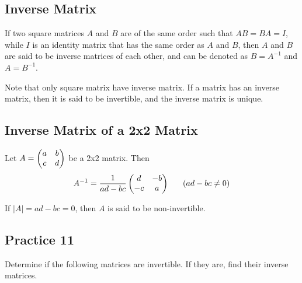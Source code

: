\documentclass{report}
\begin{document}
\begin{multicols}{2}
  \section{Inverse Matrix}

  If two square matrices $A$ and $B$ are of the same order such that $AB=BA=I$,
  while $I$ is an identity matrix that has the same order as $A$ and $B$, then
  $A$ and $B$ are said to be inverse matrices of each other, and can be denoted
  as $B = A^{-1}$ and $A = B^{-1}$.

  Note that only square matrix have inverse matrix. If a matrix has an inverse
  matrix, then it is said to be invertible, and the inverse matrix is unique.

  \subsection*{Inverse Matrix of a 2x2 Matrix}

  Let $A = \begin{pmatrix} a & b \\ c & d \end{pmatrix}$ be a 2x2 matrix. Then
  \[
    A^{-1} = \frac{1}{ad-bc} \begin{pmatrix} d & -b \\ -c & a \end{pmatrix}
    \ \ \ \ \ (ad-bc \neq 0)
  \]

  If $|A| = ad - bc = 0$, then $A$ is said to be non-invertible.

  \subsection{Practice 11}

  Determine if the following matrices are invertible. If they are, find their
  inverse matrices.


\end{multicols}
\end{document}
